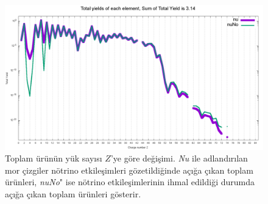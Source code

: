 \begin{figure}[hbt!]
    \centering
    \includegraphics[width=1\textwidth]{figures/abundadecay_Z_TotalYields_nu_nuNo}
    \caption[Toplam Ürünün Yük Sayısı $ Z $'ye Göre Değişimi.]{Toplam ürünün yük sayısı $ Z $'ye göre değişimi. \emph{Nu} ile adlandırılan mor çizgiler nötrino etkileşimleri gözetildiğinde açığa çıkan toplam ürünleri, \emph{nuNo}" ise nötrino etkileşimlerinin ihmal edildiği durumda açığa çıkan toplam ürünleri gösterir.}
    \label{fig:abundadecay_Z_TotalYields_nu_nuNo}
\end{figure}